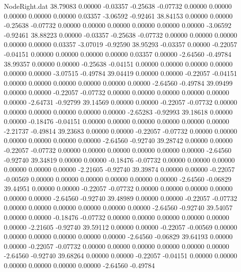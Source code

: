 \begin{filecontents}{NodeRight.dat}
  38.79083    0.00000   -0.03357    -0.25638   -0.07732    0.00000    0.00000    0.00000    0.00000    0.00000    0.03357   -3.06592   -0.92461
  38.84153    0.00000    0.00000    -0.25638   -0.07732    0.00000    0.00000    0.00000    0.00000    0.00000    0.00000   -3.06592   -0.92461
  38.88223    0.00000   -0.03357    -0.25638   -0.07732    0.00000    0.00000    0.00000    0.00000    0.00000    0.03357   -3.07019   -0.92590
  38.95293   -0.03357    0.00000    -0.22057   -0.04151    0.00000    0.00000    0.00000    0.00000    0.03357    0.00000   -2.64560   -0.49784
  38.99357    0.00000    0.00000    -0.25638   -0.04151    0.00000    0.00000    0.00000    0.00000    0.00000    0.00000   -3.07515   -0.49784
  39.04419    0.00000    0.00000    -0.22057   -0.04151    0.00000    0.00000    0.00000    0.00000    0.00000    0.00000   -2.64560   -0.49784
  39.09499    0.00000    0.00000    -0.22057   -0.07732    0.00000    0.00000    0.00000    0.00000    0.00000    0.00000   -2.64731   -0.92799
  39.14569    0.00000    0.00000    -0.22057   -0.07732    0.00000    0.00000    0.00000    0.00000    0.00000    0.00000   -2.65283   -0.92993
  39.18618    0.00000    0.00000    -0.18476   -0.04151    0.00000    0.00000    0.00000    0.00000    0.00000    0.00000   -2.21737   -0.49814
  39.23683    0.00000    0.00000    -0.22057   -0.07732    0.00000    0.00000    0.00000    0.00000    0.00000    0.00000   -2.64560   -0.92740
  39.28742    0.00000    0.00000    -0.22057   -0.07732    0.00000    0.00000    0.00000    0.00000    0.00000    0.00000   -2.64560   -0.92740
  39.34819    0.00000    0.00000    -0.18476   -0.07732    0.00000    0.00000    0.00000    0.00000    0.00000    0.00000   -2.21605   -0.92740
  39.39874    0.00000    0.00000    -0.22057   -0.00569    0.00000    0.00000    0.00000    0.00000    0.00000    0.00000   -2.64560   -0.06829
  39.44951    0.00000    0.00000    -0.22057   -0.07732    0.00000    0.00000    0.00000    0.00000    0.00000    0.00000   -2.64560   -0.92740
  39.48989    0.00000    0.00000    -0.22057   -0.07732    0.00000    0.00000    0.00000    0.00000    0.00000    0.00000   -2.64560   -0.92740
  39.54057    0.00000    0.00000    -0.18476   -0.07732    0.00000    0.00000    0.00000    0.00000    0.00000    0.00000   -2.21605   -0.92740
  39.59112    0.00000    0.00000    -0.22057   -0.00569    0.00000    0.00000    0.00000    0.00000    0.00000    0.00000   -2.64560   -0.06829
  39.64193    0.00000    0.00000    -0.22057   -0.07732    0.00000    0.00000    0.00000    0.00000    0.00000    0.00000   -2.64560   -0.92740
  39.68264    0.00000    0.00000    -0.22057   -0.04151    0.00000    0.00000    0.00000    0.00000    0.00000    0.00000   -2.64560   -0.49784

\end{filecontents}

